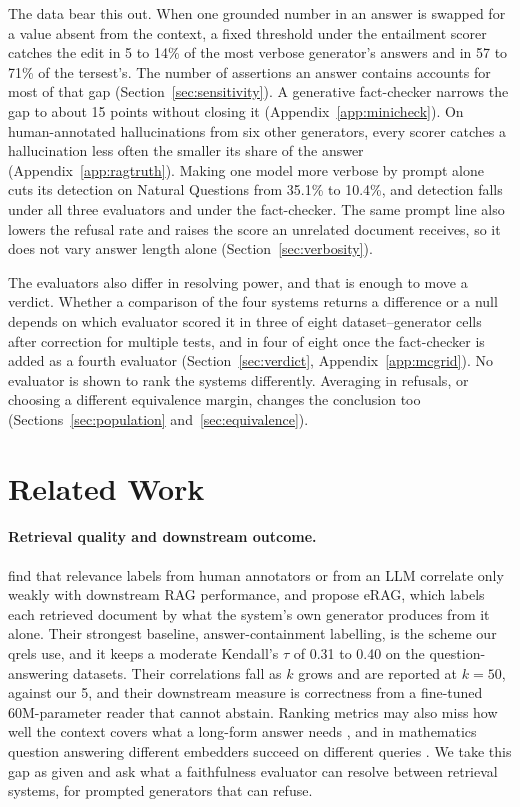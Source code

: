 \documentclass[11pt]{article}
\begin{document}
The data bear this out. When one grounded number in an answer is swapped for a value absent from the context, a fixed threshold under the entailment scorer catches the edit in 5 to 14\% of the most verbose generator's answers and in 57 to 71\% of the tersest's. The number of assertions an answer contains accounts for most of that gap (Section~\ref{sec:sensitivity}). A generative fact-checker narrows the gap to about 15 points without closing it (Appendix~\ref{app:minicheck}). On human-annotated hallucinations from six other generators, every scorer catches a hallucination less often the smaller its share of the answer (Appendix~\ref{app:ragtruth}). Making one model more verbose by prompt alone cuts its detection on Natural Questions from 35.1\% to 10.4\%, and detection falls under all three evaluators and under the fact-checker. The same prompt line also lowers the refusal rate and raises the score an unrelated document receives, so it does not vary answer length alone (Section~\ref{sec:verbosity}).

The evaluators also differ in resolving power, and that is enough to move a verdict. Whether a comparison of the four systems returns a difference or a null depends on which evaluator scored it in three of eight dataset--generator cells after correction for multiple tests, and in four of eight once the fact-checker is added as a fourth evaluator (Section~\ref{sec:verdict}, Appendix~\ref{app:mcgrid}). No evaluator is shown to rank the systems differently. Averaging in refusals, or choosing a different equivalence margin, changes the conclusion too (Sections~\ref{sec:population} and~\ref{sec:equivalence}).


\section{Related Work}
\label{sec:related}

\paragraph{Retrieval quality and downstream outcome.}
\citet{salemi-zamani-2024} find that relevance labels from human annotators or from an LLM correlate only weakly with downstream RAG performance, and propose eRAG, which labels each retrieved document by what the system's own generator produces from it alone. Their strongest baseline, answer-containment labelling, is the scheme our qrels use, and it keeps a moderate Kendall's $\tau$ of 0.31 to 0.40 on the question-answering datasets. Their correlations fall as $k$ grows and are reported at $k = 50$, against our 5, and their downstream measure is correctness from a fine-tuned 60M-parameter reader that cannot abstain. Ranking metrics may also miss how well the context covers what a long-form answer needs \citep{ju-etal-2025-controlled}, and in mathematics question answering different embedders succeed on different queries \citep{chen-etal-2025}. We take this gap as given and ask what a faithfulness evaluator can resolve between retrieval systems, for prompted generators that can refuse.
\end{document}
